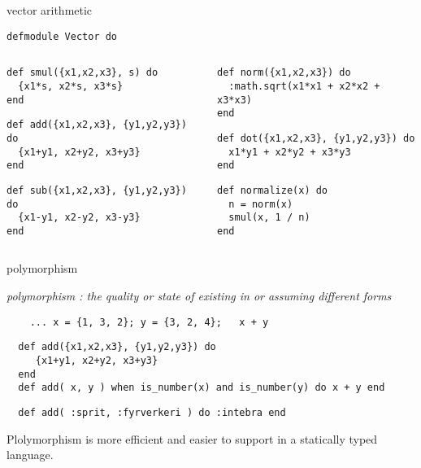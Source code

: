 \begin{frame}[fragile]{vector arithmetic}

\begin{verbatim}
defmodule Vector do
\end{verbatim}


\begin{columns}
  \begin{column}{0.5\linewidth}
  \begin{verbatim}
def smul({x1,x2,x3}, s) do
  {x1*s, x2*s, x3*s}
end
  \end{verbatim}
\pause
  \begin{verbatim}
def add({x1,x2,x3}, {y1,y2,y3}) do
  {x1+y1, x2+y2, x3+y3}
end
  \end{verbatim}
\pause
  \begin{verbatim}
def sub({x1,x2,x3}, {y1,y2,y3}) do
  {x1-y1, x2-y2, x3-y3}
end
  \end{verbatim}
  \end{column}

  \pause

  \begin{column}{0.5\linewidth}
  \begin{verbatim}
def norm({x1,x2,x3}) do
  :math.sqrt(x1*x1 + x2*x2 + x3*x3)
end
  \end{verbatim}
  \begin{verbatim}
def dot({x1,x2,x3}, {y1,y2,y3}) do
  x1*y1 + x2*y2 + x3*y3
end
  \end{verbatim}
\pause
  \begin{verbatim}
def normalize(x) do
  n = norm(x)
  smul(x, 1 / n)
end
  \end{verbatim}
  \end{column}
 \end{columns}

\end{frame}

\begin{frame}[fragile]{polymorphism}

\pause
{\em polymorphism : the quality or state of existing in or assuming different forms}

\pause

\begin{verbatim}
    ... x = {1, 3, 2}; y = {3, 2, 4};   x + y 
\end{verbatim}

\pause

\begin{verbatim}
  def add({x1,x2,x3}, {y1,y2,y3}) do
     {x1+y1, x2+y2, x3+y3}
  end
  def add( x, y ) when is_number(x) and is_number(y) do x + y end
\end{verbatim}\pause
\begin{verbatim}
  def add( :sprit, :fyrverkeri ) do :intebra end
\end{verbatim} 

\pause
\vspace{20pt}
Plolymorphism is more efficient and easier to support in a statically typed language. 

\end{frame}

